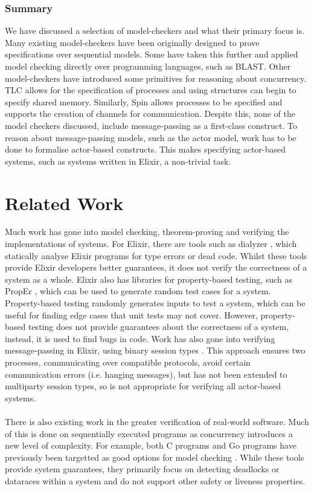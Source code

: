 \subsubsection{Summary}
We have discussed a selection of model-checkers and what their primary focus is. Many existing model-checkers have been originally designed to prove specifications over sequential models. Some have taken this further and applied model checking directly over programming languages, such as BLAST. Other model-checkers have introduced some primitives for reasoning about concurrency. TLC allows for the specification of processes and using structures can begin to specify shared memory. Similarly, Spin allows processes to be specified and supports the creation of channels for communication. Despite this, none of the model checkers discussed, include message-passing as a first-class construct. To reason about message-passing models, such as the actor model, work has to be done to formalise actor-based constructs. This makes specifying actor-based systems, such as systems written in Elixir, a non-trivial task.

\section{Related Work} \label{sec:existing_work}
Much work has gone into model checking, theorem-proving and verifying the implementations of systems. For Elixir, there are tools such as dialyzer \cite{dialyzer}, which statically analyse Elixir programs for type errors or dead code. Whilst these tools provide Elixir developers better guarantees, it does not verify the correctness of a system as a whole. Elixir also has libraries for property-based testing, such as PropEr \cite{proper}, which can be used to generate random test cases for a system. Property-based testing randomly generates inputs to test a system, which can be useful for finding edge cases that unit tests may not cover. However, property-based testing does not provide guarantees about the correctness of a system, instead, it is used to find bugs in code. Work has also gone into verifying message-passing in Elixir, using binary session types \cite{binary_session_types}. This approach ensures two processes, communicating over compatible protocols, avoid certain communication errors (i.e. hanging messages), but has not been extended to multiparty session types, so is not appropriate for verifying all actor-based systems.
\\ \\
There is also existing work in the greater verification of real-world software. Much of this is done on sequentially executed programs as concurrency introduces a new level of complexity. For example, both C programs and Go programs have previously been targetted as good options for model checking \cite{gomela, c_to_promela}. While these tools provide system guarantees, they primarily focus on detecting deadlocks or dataraces within a system and do not support other safety or liveness properties.
